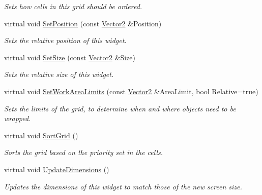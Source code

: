 \begin{DoxyCompactItemize}
\begin{DoxyCompactList}\small\item\em Sets how cells in this grid should be ordered. \item\end{DoxyCompactList}\item 
virtual void \hyperlink{classMezzanine_1_1UI_1_1CellGrid_ab6e210edb5ec0167f61c9dc2dafef108}{SetPosition} (const \hyperlink{classMezzanine_1_1Vector2}{Vector2} \&Position)
\begin{DoxyCompactList}\small\item\em Sets the relative position of this widget. \item\end{DoxyCompactList}\item 
virtual void \hyperlink{classMezzanine_1_1UI_1_1CellGrid_afcff9353be7ea7408aa2ea621efdaf99}{SetSize} (const \hyperlink{classMezzanine_1_1Vector2}{Vector2} \&Size)
\begin{DoxyCompactList}\small\item\em Sets the relative size of this widget. \item\end{DoxyCompactList}\item 
virtual void \hyperlink{classMezzanine_1_1UI_1_1CellGrid_af3de91eb3de30b73cf2b8c6f0c7f266f}{SetWorkAreaLimits} (const \hyperlink{classMezzanine_1_1Vector2}{Vector2} \&AreaLimit, bool Relative=true)
\begin{DoxyCompactList}\small\item\em Sets the limits of the grid, to determine when and where objects need to be wrapped. \item\end{DoxyCompactList}\item 
\hypertarget{classMezzanine_1_1UI_1_1CellGrid_a276e97c0b2c8b8e1ed6a979708b445ef}{
virtual void \hyperlink{classMezzanine_1_1UI_1_1CellGrid_a276e97c0b2c8b8e1ed6a979708b445ef}{SortGrid} ()}
\label{classMezzanine_1_1UI_1_1CellGrid_a276e97c0b2c8b8e1ed6a979708b445ef}

\begin{DoxyCompactList}\small\item\em Sorts the grid based on the priority set in the cells. \item\end{DoxyCompactList}\item 
virtual void \hyperlink{classMezzanine_1_1UI_1_1CellGrid_a11cda11f70cd331c9bd39daf0b0f24aa}{UpdateDimensions} ()
\begin{DoxyCompactList}\small\item\em Updates the dimensions of this widget to match those of the new screen size. \item\end{DoxyCompactList}\end{DoxyCompactItemize}
